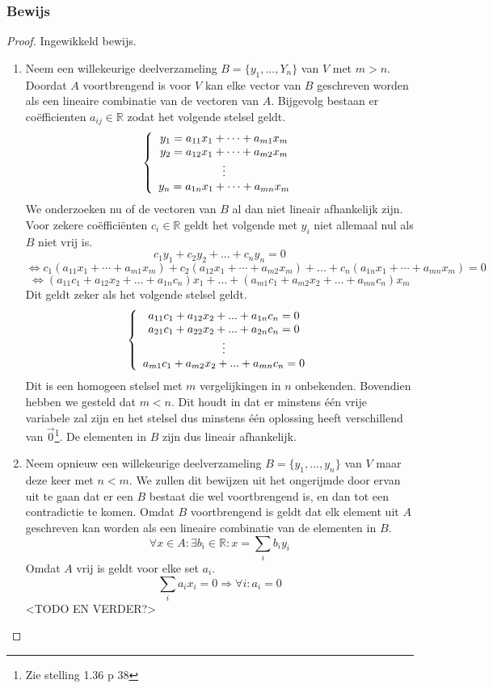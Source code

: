 \documentclass[lineaire_algebra_oplossingen.tex]{subfiles}
\begin{document}
\subsubsection*{Bewijs}
\begin{proof}
Ingewikkeld bewijs.\\
\begin{enumerate}
\item
Neem een willekeurige deelverzameling $B = \{y_1,...,Y_n\}$ van $V$ met $m > n$.\\
Doordat $A$ voortbrengend is voor $V$ kan elke vector van $B$ geschreven worden als een lineaire combinatie van de vectoren van $A$. Bijgevolg bestaan er co\"efficienten $a_{ij}\in \mathbb{R}$ zodat het volgende stelsel geldt.
\[
\left\lbrace
\begin{array}{c c}
y_1 = a_{11}x_1 + \cdots + a_{m1}x_m\\
y_2 = a_{12}x_1 + \cdots + a_{m2}x_m\\
\vdots\\
y_n = a_{1n}x_1 + \cdots + a_{mn}x_m\\
\end{array}
\right.
\]
We onderzoeken nu of de vectoren van $B$ al dan niet lineair afhankelijk zijn. Voor zekere co\"effici\"enten $c_i\in \mathbb{R}$ geldt het volgende met $y_i$ niet allemaal nul als $B$ niet vrij is.
\[
c_1y_1 + c_2y_2 + ... + c_ny_n = 0
\]
\[
\Leftrightarrow
c_1(a_{11}x_1 + \cdots + a_{m1}x_m) + c_2(a_{12}x_1 + \cdots + a_{m2}x_m) + ... + c_n(a_{1n}x_1 + \cdots + a_{mn}x_m) = 0
\]
\[
\Leftrightarrow
(a_{11}c_1+a_{12}x_2+...+a_{1n}c_n)x_1 + ... + (a_{m1}c_1+a_{m2}x_2+...+a_{mn}c_n)x_m
\]
Dit geldt zeker als het volgende stelsel geldt.
\[
\left\{
\begin{array}{c c}
a_{11}c_1+a_{12}x_2+...+a_{1n}c_n = 0\\
a_{21}c_1+a_{22}x_2+...+a_{2n}c_n = 0\\
\vdots\\
a_{m1}c_1+a_{m2}x_2+...+a_{mn}c_n = 0\\
\end{array}
\right.
\]
Dit is een homogeen stelsel met $m$ vergelijkingen in $n$ onbekenden. Bovendien hebben we gesteld dat $m<n$. Dit houdt in dat er minstens één vrije variabele zal zijn en het stelsel dus minstens één oplossing heeft verschillend van $\vec{0}$\footnote{Zie stelling 1.36 p 38}.
De elementen in $B$ zijn dus lineair afhankelijk.
\item
Neem opnieuw een willekeurige deelverzameling $B = \{y_1,...,y_n\}$ van $V$ maar deze keer met $n < m$. We zullen dit bewijzen uit het ongerijmde door ervan uit te gaan dat er een $B$ bestaat die wel voortbrengend is, en dan tot een contradictie te komen.
Omdat $B$ voortbrengend is geldt dat elk element uit $A$ geschreven kan worden als een lineaire combinatie van de elementen in $B$.
\[
\forall x \in A: \exists b_i \in \mathbb{R}: x = \sum_ib_iy_i
\]
Omdat $A$ vrij is geldt voor elke set $a_i$.
\[
\sum_ia_ix_i = 0 \Rightarrow \forall i: a_i = 0
\]
<TODO EN VERDER?>

\end{enumerate}
\end{proof}
\end{document}
